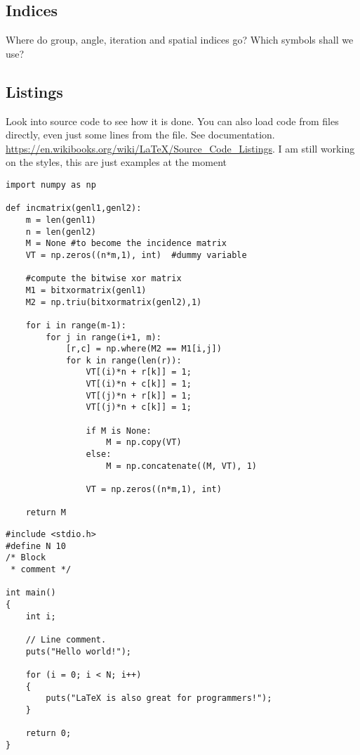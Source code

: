 \documentclass[10pt,letterpaper,oneside]{article}
\begin{document}
\subsection{Indices}
Where do group, angle, iteration and spatial indices go? Which symbols shall we use?


\subsection{Listings}
Look into source code to see how it is done. You can also load code from files directly, even just some  lines from the file. See documentation.
\url{https://en.wikibooks.org/wiki/LaTeX/Source_Code_Listings}. I am still working on the styles, this are just examples at the moment
\begin{lstlisting}[style=python,caption={Python example},label={lst:python}]
import numpy as np

def incmatrix(genl1,genl2):
    m = len(genl1)
    n = len(genl2)
    M = None #to become the incidence matrix
    VT = np.zeros((n*m,1), int)  #dummy variable

    #compute the bitwise xor matrix
    M1 = bitxormatrix(genl1)
    M2 = np.triu(bitxormatrix(genl2),1)

    for i in range(m-1):
        for j in range(i+1, m):
            [r,c] = np.where(M2 == M1[i,j])
            for k in range(len(r)):
                VT[(i)*n + r[k]] = 1;
                VT[(i)*n + c[k]] = 1;
                VT[(j)*n + r[k]] = 1;
                VT[(j)*n + c[k]] = 1;

                if M is None:
                    M = np.copy(VT)
                else:
                    M = np.concatenate((M, VT), 1)

                VT = np.zeros((n*m,1), int)

    return M
\end{lstlisting}

\begin{lstlisting}[style=cpp,caption={C++ example},label={lst:moose}]
#include <stdio.h>
#define N 10
/* Block
 * comment */

int main()
{
    int i;

    // Line comment.
    puts("Hello world!");

    for (i = 0; i < N; i++)
    {
        puts("LaTeX is also great for programmers!");
    }

    return 0;
}
\end{lstlisting}
\end{document}
